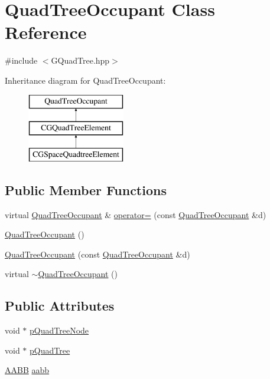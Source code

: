 \hypertarget{class_quad_tree_occupant}{}\section{Quad\+Tree\+Occupant Class Reference}
\label{class_quad_tree_occupant}


{\ttfamily \#include $<$G\+Quad\+Tree.\+hpp$>$}

Inheritance diagram for Quad\+Tree\+Occupant\+:\begin{figure}[H]
\begin{center}
\leavevmode
\includegraphics[height=3.000000cm]{class_quad_tree_occupant}
\end{center}
\end{figure}
\subsection*{Public Member Functions}
\begin{DoxyCompactItemize}
\item 
virtual \hyperlink{class_quad_tree_occupant}{Quad\+Tree\+Occupant} \& \hyperlink{class_quad_tree_occupant_ad741488cb538e6bf511b61cf8be79513}{operator=} (const \hyperlink{class_quad_tree_occupant}{Quad\+Tree\+Occupant} \&d)
\item 
\hyperlink{class_quad_tree_occupant_a6a076e5144dc13db89b2507f2bb2f263}{Quad\+Tree\+Occupant} ()
\item 
\hyperlink{class_quad_tree_occupant_a842c9f62b0a5517a64174c85b565a9d2}{Quad\+Tree\+Occupant} (const \hyperlink{class_quad_tree_occupant}{Quad\+Tree\+Occupant} \&d)
\item 
virtual \hyperlink{class_quad_tree_occupant_ab3f6a571f2e48b678ec6e71317338217}{$\sim$\+Quad\+Tree\+Occupant} ()
\end{DoxyCompactItemize}
\subsection*{Public Attributes}
\begin{DoxyCompactItemize}
\item 
void $\ast$ \hyperlink{class_quad_tree_occupant_adb6031d6b9054c136f63b495813b622c}{p\+Quad\+Tree\+Node}
\item 
void $\ast$ \hyperlink{class_quad_tree_occupant_a1007f76c1b604d3a4a85ccc14cc6e377}{p\+Quad\+Tree}
\item 
\hyperlink{struct_a_a_b_b}{A\+A\+B\+B} \hyperlink{class_quad_tree_occupant_a8175c4f4ae357739f9fbdc000426229c}{aabb}
\end{DoxyCompactItemize}


